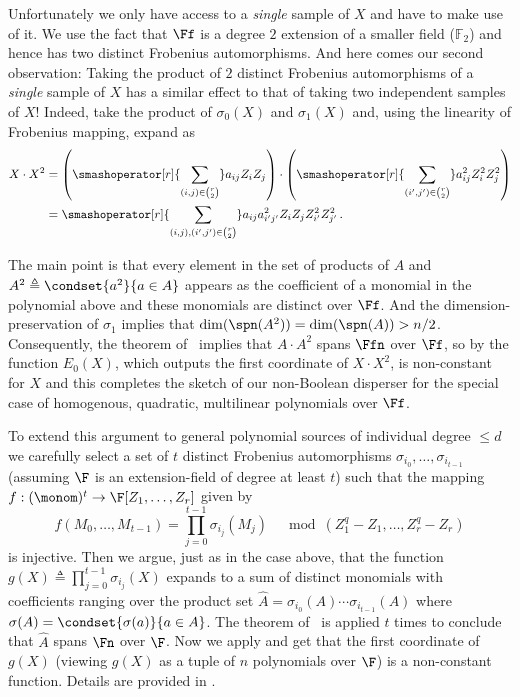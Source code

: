 Unfortunately we only have access to a \emph{single } sample of $X$ and have to make use of it. We use the fact that $\Ff$ is a degree $2$ extension of a smaller field ($\mathbb{F}_2$) and hence has two distinct Frobenius automorphisms. And here comes our second observation: Taking the product of $2$ distinct Frobenius automorphisms of a \emph{single} sample of $X$ has a similar effect to that of taking two independent samples of $X$! Indeed, take the product of $\sigma_0(X)$ and $\sigma_1(X)$ and, using the linearity of Frobenius mapping, expand as
\begin{align*}
X\cdot X^2 &= \left(\smashoperator[r]{\sum_{(i,j) \in\binom{r}{2}}} a_{ij} Z_i Z_j \right)\cdot\left(\smashoperator[r]{\sum_{(i', j')\in\binom{r}{2}}} a_{ij}^2 Z_i^2 Z_j^2 \right) \\
&= \smashoperator[r]{\sum_{(i,j), (i', j')\in\binom{r}{2}}} a_{ij} a_{i'j'}^2 Z_i Z_j Z_{i'}^2 Z_{j'}^2\,.
\end{align*}

The main point is that every element in the set of products of $A$ and $A^2\triangleq\condset{a^2}{a\in A}$ appears as the coefficient of a monomial in the polynomial above and these monomials are distinct over $\Ff$. And the dimension-preservation of $\sigma_1$ implies that $\dim(\spn(A^2))=\dim(\spn(A))>n/2$. Consequently, the theorem of~\cite{HLX02} implies that $A\cdot A^2$ spans $\Ffn$ over $\Ff$, so by  the function $E_0(X)$, which outputs the first coordinate of $X\cdot X^2$, is non-constant for $X$ and this completes the sketch of our non-Boolean disperser for the special case of homogenous, quadratic, multilinear polynomials over $\Ff$.
%
%
%

To extend this argument to general polynomial sources of individual degree $\leq d$ we carefully select a set of $t$ distinct Frobenius automorphisms $\sigma_{i_0},\ldots, \sigma_{i_{t-1}}$ (assuming $\F$ is an extension-field of degree at least $t$) such that the
 mapping $f:(\monom)^t\to \F[Z_1,\ldots,Z_r]$ given by \[f(M_0,\ldots,M_{t-1})=\prod_{j=0}^{t-1} \sigma_{i_j}(M_j)\quad \bmod (Z_1^q-Z_1,\ldots, Z_r^q-Z_r)\]
is injective. Then we argue, just as in the case above, that the function $g(X)\triangleq \prod_{j=0}^{t-1} \sigma_{i_j}(X)$ expands to a sum of distinct monomials with coefficients ranging over the product set $\hat{A}=\sigma_{i_0}(A)\cdots \sigma_{i_{t-1}}(A)$ where $\sigma(A)=\condset{\sigma(a)}{a\in A}$. The theorem of~\cite{HLX02} is applied $t$ times to conclude that $\hat{A}$ spans $\Fn$ over $\F$. Now we apply  and get that the first coordinate of $g(X)$ (viewing $g(X)$ as a tuple of $n$ polynomials over $\F$) is a non-constant function. Details are provided in .

